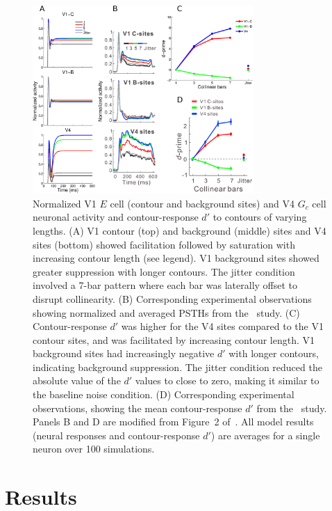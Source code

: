 \begin{figure}[htbp]
\centering
\includegraphics[width=0.75\textwidth]{Contour/figs/Fig4.eps}
\makeatletter
\let\@currsize\normalsize
\caption{Normalized V1 $E$ cell (contour and background sites) and V4 $G_c$ cell neuronal activity and contour-response $d'$ to contours of varying lengths. (A) V1 contour (top) and background (middle) sites and V4 sites (bottom) showed facilitation followed by saturation with increasing contour length (see legend). V1 background sites showed greater suppression with longer contours. The jitter condition involved a 7-bar pattern where each bar was laterally offset to disrupt collinearity. (B) Corresponding experimental observations showing normalized and averaged PSTHs from   the~\cite{Chen_etal14} study. (C) Contour-response $d'$ was higher for the V4 sites compared to the V1 contour sites, and was facilitated by  increasing contour length. V1 background sites had increasingly  negative $d'$ with longer contours, indicating background suppression. The jitter condition reduced the absolute value of the $d'$ values to close to zero, making it similar to the baseline noise condition. (D) Corresponding experimental observations, showing the mean contour-response $d'$ from the~\cite{Chen_etal14} study. Panels B and D are modified from Figure~2 of~\cite{Chen_etal14}. All model results (neural responses and contour-response $d'$) are averages for a single neuron over 100 simulations.}
\label{Fig:Neural_responses}
\end{figure}

\section{Results}
\label{sec:results}
